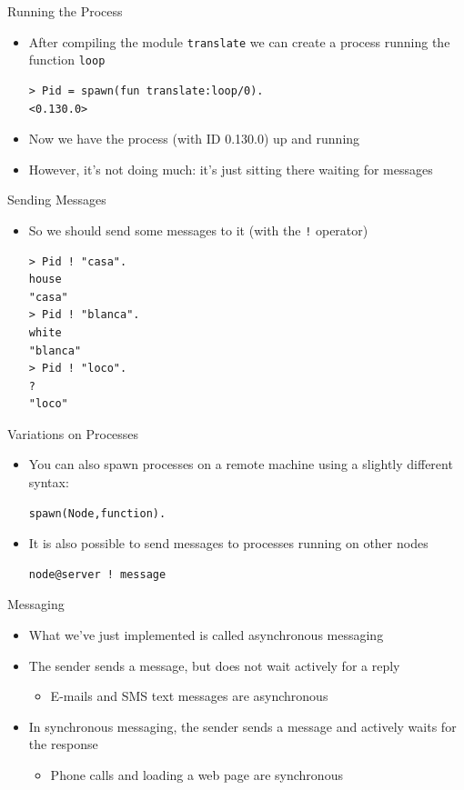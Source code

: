 \documentclass[12pt,xcolor=svgnames]{beamer}
\begin{document}
\begin{frame}[fragile]{Running the Process}
\begin{itemize}
\item After compiling the module \texttt{translate} we can create a process running the function \texttt{loop}
\begin{Verbatim}
> Pid = spawn(fun translate:loop/0).
<0.130.0>
\end{Verbatim}
\item Now we have the process (with ID 0.130.0) up and running
\item However, it's not doing much: it's just sitting there waiting for messages
\end{itemize}
\end{frame}

\begin{frame}[fragile]{Sending Messages}
\begin{itemize}
\item So we should send some messages to it (with the \texttt{!} operator)
\begin{Verbatim}
> Pid ! "casa".
house
"casa"
> Pid ! "blanca".
white
"blanca"
> Pid ! "loco".  
?
"loco"
\end{Verbatim}
\end{itemize}
\end{frame}

\begin{frame}[fragile]{Variations on Processes}
\begin{itemize}
\item You can also spawn processes on a remote machine using a slightly different syntax:
\begin{Verbatim}
spawn(Node,function).
\end{Verbatim}
\item It is also possible to send messages to processes running on other nodes
\begin{Verbatim}
node@server ! message
\end{Verbatim}
\end{itemize}
\end{frame}

\begin{frame}{Messaging}
\begin{itemize}
\item What we've just implemented is called asynchronous messaging
\item The sender sends a message, but does not wait actively for a reply
\begin{itemize}
\item E-mails and SMS text messages are asynchronous
\end{itemize}
\item In synchronous messaging, the sender sends a message and actively waits for the response
\begin{itemize}
\item Phone calls and loading a web page are synchronous 
\end{itemize}
\end{itemize}
\end{frame}
\end{document}
